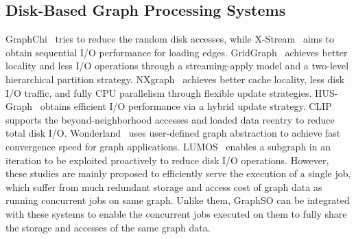 \documentclass[10pt,journal,compsoc]{IEEEtran}
\begin{document}
\subsection{Disk-Based Graph Processing Systems}
\vspace{-2pt}
GraphChi~\cite{GraphChi} tries to reduce the random disk accesses, while X-Stream~\cite{X-stream} aims to obtain sequential I/O performance for loading edges.
GridGraph~\cite{GridGraph} achieves better locality and less I/O operations through a streaming-apply model and a two-level hierarchical partition strategy.
NXgraph~\cite{NXgraph} achieves better cache locality, less disk I/O traffic, and fully CPU parallelism through flexible update strategies.
HUS-Graph~\cite{HUS-Graph} obtains efficient I/O performance via a hybrid update strategy.
CLIP~\cite{CLIP} supports the beyond-neighborhood accesses and loaded data reentry to reduce total disk I/O.
Wonderland~\cite{Wonderland} uses user-defined graph abstraction to achieve fast convergence speed for graph applications.
LUMOS~\cite{LUMOS} enables a subgraph in an iteration to be exploited proactively to reduce disk I/O operations.
However, these studies are mainly proposed to efficiently serve the execution of a single job, which suffer from much redundant storage and access cost of graph data as running concurrent jobs on same graph. Unlike them, GraphSO can be integrated with these systems to enable the concurrent jobs executed on them to fully share the storage and accesses of the same graph data.

\vspace{-10pt}
\end{document}
